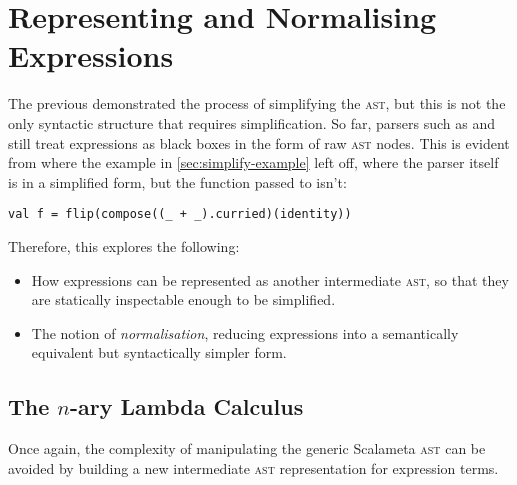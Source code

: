 \documentclass[../../../main.tex]{subfiles}
\begin{document}
\section{Representing and Normalising Expressions}\label{sec:simplify-exprs}


The previous  demonstrated the process of simplifying the  \textsc{ast}, but this is not the only syntactic structure that requires simplification.
So far, parsers such as  and  still treat expressions as black boxes in the form of raw  \textsc{ast} nodes.
This is evident from where the example in \cref{sec:simplify-example} left off, where the parser itself is in a simplified form, but the function passed to  isn't:
\begin{verbatim}
val f = flip(compose((_ + _).curried)(identity))
\end{verbatim}
%
Therefore, this  explores the following:
\begin{itemize}
  \item How expressions can be represented as another intermediate \textsc{ast}, so that they are statically inspectable enough to be simplified.
  \item The notion of \emph{normalisation}, reducing expressions into a semantically equivalent but syntactically simpler form.
\end{itemize}

\subsection{The $n$-ary Lambda Calculus}
Once again, the complexity of manipulating the generic Scalameta \textsc{ast} can be avoided by building a new intermediate \textsc{ast} representation for expression terms.
\end{document}
